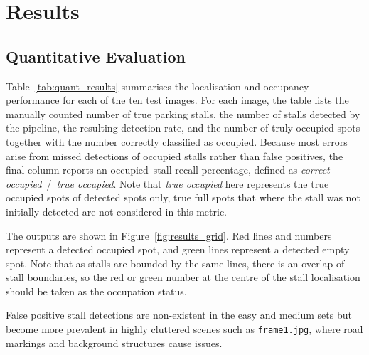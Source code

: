 \documentclass[9pt,journal]{IEEEtran}
\begin{document}
	\section{Results}
	\label{sec:results}
	
	\subsection{Quantitative Evaluation}
	
	Table~\ref{tab:quant_results} summarises the localisation and occupancy performance for each of the ten test images. For each image, the table lists the manually counted number of true parking stalls, the number of stalls detected by the pipeline, the resulting detection rate, and the number of truly occupied spots together with the number correctly classified as occupied. Because most errors arise from missed detections of occupied stalls rather than false positives, the final column reports an occupied--stall recall percentage, defined as \emph{correct occupied}~/~\emph{true occupied}. Note that \emph{true occupied} here represents the true occupied spots of detected spots only, true full spots that where the stall was not initially detected are not considered in this metric.
	
	The outputs are shown in Figure~\ref{fig:results_grid}. Red lines and numbers represent a detected occupied spot, and green lines represent a detected empty spot. Note that as stalls are bounded by the same lines, there is an overlap of stall boundaries, so the red or green number at the centre of the stall localisation should be taken as the occupation status.
	
	False positive stall detections are non-existent in the easy and medium sets but become more prevalent in highly cluttered scenes such as \texttt{frame1.jpg}, where road markings and background structures cause issues.
	
\end{document}
